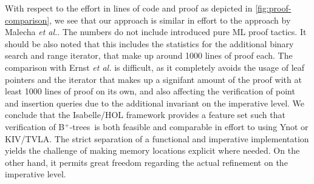 \documentclass[a4paper,UKenglish,cleveref, autoref, thm-restate]{lipics-v2021}
\newcommand{\btrees}{B$^+$-trees}
\begin{document}
With respect to the effort in lines of code and proof
as depicted in \autoref{fig:proof-comparison}, we see
that our approach is similar in effort to the approach by Malecha \emph{et al.}.
The numbers do not include introduced pure ML proof tactics.
It should be also noted that this includes the statistics
for the additional binary search and range iterator,
that make up around 1000 lines of proof each.
The comparison with Ernst \emph{et al.} is difficult, as it completely
avoids the usage of leaf pointers and the iterator
that makes up a signifant amount of the proof
with at least 1000 lines of proof on its own, and also
affecting the verification of point and insertion queries
due to the additional invariant on the imperative level.
We conclude that the Isabelle/HOL framework
provides a feature set
such that verification of \btrees\ is both feasible
and comparable in effort to using Ynot or KIV/TVLA.
The strict separation of a functional and imperative
implementation yields the challenge
of making memory locations explicit where needed.
On the other hand, it permits great freedom
regarding the actual refinement on the imperative level.
\end{document}
